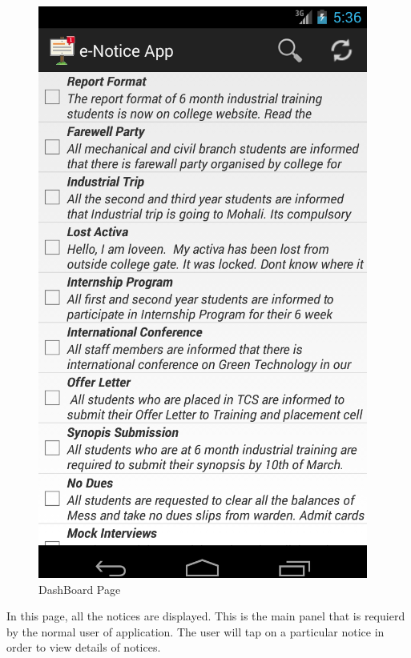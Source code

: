 \begin{figure}[H]
\centering \includegraphics[scale=0.7]{image/dashboard.png}
\caption{DashBoard Page}
\end{figure}

In this page, all the notices are displayed. This is the main panel that is requierd by the normal user of application.
The user will tap on a particular notice in order to view details of notices.

